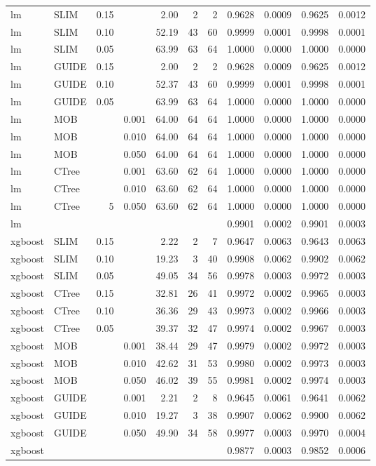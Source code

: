 \begin{table}[!htb]
\begin{tabular}[t]{l|l|r|r|r|r|r|r|r|r|r}
\hline
lm & SLIM & 0.15 & & 2.00 & 2 & 2 & 0.9628 & 0.0009 & 0.9625 & 0.0012\\
lm & SLIM & 0.10 & & 52.19 & 43 & 60 & 0.9999 & 0.0001 & 0.9998 & 0.0001\\
lm & SLIM & 0.05 & & 63.99 & 63 & 64 & 1.0000 & 0.0000 & 1.0000 & 0.0000\\
lm & GUIDE & 0.15 &  & 2.00 & 2 & 2 & 0.9628 & 0.0009 & 0.9625 & 0.0012\\
lm & GUIDE & 0.10 &  & 52.37 & 43 & 60 & 0.9999 & 0.0001 & 0.9998 & 0.0001\\
lm & GUIDE & 0.05 & & 63.99 & 63 & 64 & 1.0000 & 0.0000 & 1.0000 & 0.0000\\
lm & MOB & & 0.001 & 64.00 & 64 & 64 & 1.0000 & 0.0000 & 1.0000 & 0.0000\\
lm & MOB & & 0.010 & 64.00 & 64 & 64 & 1.0000 & 0.0000 & 1.0000 & 0.0000\\
lm & MOB & & 0.050 & 64.00 & 64 & 64 & 1.0000 & 0.0000 & 1.0000 & 0.0000\\
lm & CTree & & 0.001 & 63.60 & 62 & 64 & 1.0000 & 0.0000 & 1.0000 & 0.0000\\
lm & CTree & & 0.010 & 63.60 & 62 & 64 & 1.0000 & 0.0000 & 1.0000 & 0.0000\\
lm & CTree &5 & 0.050 & 63.60 & 62 & 64 & 1.0000 & 0.0000 & 1.0000 & 0.0000\\
\hline
lm & & & & & & & 0.9901 & 0.0002 & 0.9901 & 0.0003\\
\hline



xgboost & SLIM & 0.15 & & 2.22 & 2 & 7 & 0.9647 & 0.0063 & 0.9643 & 0.0063\\
xgboost & SLIM & 0.10 & & 19.23 & 3 & 40 & 0.9908 & 0.0062 & 0.9902 & 0.0062\\
xgboost & SLIM & 0.05 & & 49.05 & 34 & 56 & 0.9978 & 0.0003 & 0.9972 & 0.0003\\
xgboost & CTree & 0.15 & & 32.81 & 26 & 41 & 0.9972 & 0.0002 & 0.9965 & 0.0003\\
xgboost & CTree & 0.10 & & 36.36 & 29 & 43 & 0.9973 & 0.0002 & 0.9966 & 0.0003\\
xgboost & CTree & 0.05 & & 39.37 & 32 & 47 & 0.9974 & 0.0002 & 0.9967 & 0.0003\\
xgboost & MOB & & 0.001 & 38.44 & 29 & 47 & 0.9979 & 0.0002 & 0.9972 & 0.0003\\
xgboost & MOB & & 0.010 & 42.62 & 31 & 53 & 0.9980 & 0.0002 & 0.9973 & 0.0003\\
xgboost & MOB & & 0.050 & 46.02 & 39 & 55 & 0.9981 & 0.0002 & 0.9974 & 0.0003\\
xgboost & GUIDE & & 0.001 & 2.21 & 2 & 8 & 0.9645 & 0.0061 & 0.9641 & 0.0062\\
xgboost & GUIDE & & 0.010 & 19.27 & 3 & 38 & 0.9907 & 0.0062 & 0.9900 & 0.0062\\
xgboost & GUIDE & & 0.050 & 49.90 & 34 & 58 & 0.9977 & 0.0003 & 0.9970 & 0.0004\\
\hline
xgboost & & & & & & & 0.9877 & 0.0003 & 0.9852 & 0.0006\\
\hline


\end{tabular}
\end{table}
